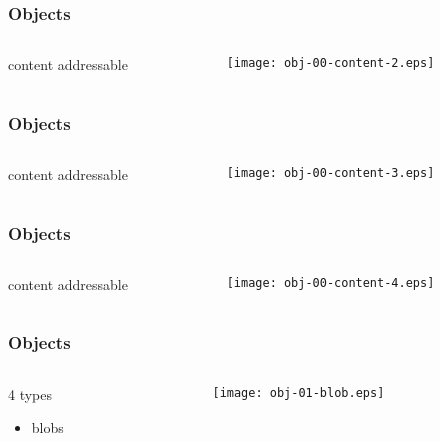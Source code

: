 \documentclass[english]{beamer}
\begin{document}
\begin{frame}
\frametitle{Objects}
\begin{columns}[t]
        \begin{column}[T]{.5\textwidth}
                content addressable
        \end{column}
        \begin{column}[T]{.5\textwidth}
                \texttt{[image: obj-00-content-2.eps]}
        \end{column}
\end{columns}
\end{frame}

\begin{frame}
\frametitle{Objects}
\begin{columns}[t]
        \begin{column}[T]{.5\textwidth}
                content addressable
        \end{column}
        \begin{column}[T]{.5\textwidth}
                \texttt{[image: obj-00-content-3.eps]}
        \end{column}
\end{columns}
\end{frame}

\begin{frame}
\frametitle{Objects}
\begin{columns}[t]
        \begin{column}[T]{.5\textwidth}
                content addressable
        \end{column}
        \begin{column}[T]{.5\textwidth}
                \texttt{[image: obj-00-content-4.eps]}
        \end{column}
\end{columns}
\end{frame}

\begin{frame}
\frametitle{Objects}
\begin{columns}[t]
        \begin{column}[T]{.5\textwidth}
                4 types
                \begin{itemize}
                        \item blobs
                \end{itemize}
        \end{column}
        \begin{column}[T]{.5\textwidth}
                \texttt{[image: obj-01-blob.eps]}
        \end{column}
\end{columns}
\end{frame}
\end{document}
